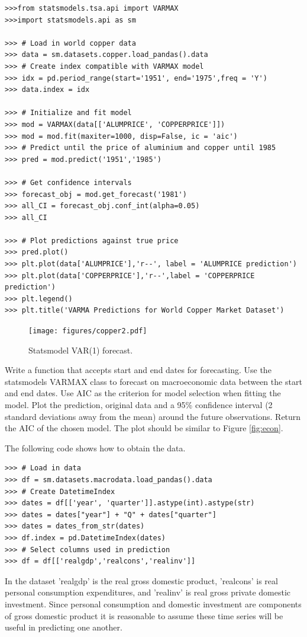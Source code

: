 \begin{lstlisting}
>>>from statsmodels.tsa.api import VARMAX
>>>import statsmodels.api as sm

>>> # Load in world copper data
>>> data = sm.datasets.copper.load_pandas().data
>>> # Create index compatible with VARMAX model
>>> idx = pd.period_range(start='1951', end='1975',freq = 'Y')
>>> data.index = idx

>>> # Initialize and fit model
>>> mod = VARMAX(data[['ALUMPRICE', 'COPPERPRICE']])
>>> mod = mod.fit(maxiter=1000, disp=False, ic = 'aic')
>>> # Predict until the price of aluminium and copper until 1985
>>> pred = mod.predict('1951','1985')

>>> # Get confidence intervals
>>> forecast_obj = mod.get_forecast('1981')
>>> all_CI = forecast_obj.conf_int(alpha=0.05)
>>> all_CI

>>> # Plot predictions against true price
>>> pred.plot()
>>> plt.plot(data['ALUMPRICE'],'r--', label = 'ALUMPRICE prediction')
>>> plt.plot(data['COPPERPRICE'],'r--',label = 'COPPERPRICE prediction')
>>> plt.legend()
>>> plt.title('VARMA Predictions for World Copper Market Dataset')
\end{lstlisting}

\begin{figure}[H]
\centering
\texttt{[image: figures/copper2.pdf]}
\caption{Statsmodel VAR(1) forecast.}
\label{fig:varma}
\end{figure}

\begin{problem}
\label{prob:arma:smvarma}

Write a function  that accepts start and end dates for forecasting.
Use the statsmodels VARMAX class to forecast on macroeconomic data between the start and end dates.
Use AIC as the criterion for model selection when fitting the model.
Plot the prediction, original data and  a 95\% confidence interval (2 standard deviations away from the mean) around the future observations.
Return the AIC of the chosen model.
The plot should be similar to Figure \ref{fig:econ}.

The following code shows how to obtain the data.

\begin{lstlisting}
>>> # Load in data
>>> df = sm.datasets.macrodata.load_pandas().data
>>> # Create DatetimeIndex
>>> dates = df[['year', 'quarter']].astype(int).astype(str)
>>> dates = dates["year"] + "Q" + dates["quarter"]
>>> dates = dates_from_str(dates)
>>> df.index = pd.DatetimeIndex(dates)
>>> # Select columns used in prediction
>>> df = df[['realgdp','realcons','realinv']]
\end{lstlisting}

In the dataset 'realgdp' is the real gross domestic product, 'realcons' is real personal consumption expenditures, and 'realinv' is real gross private domestic investment.
Since personal consumption and domestic investment are components of gross domestic product it is reasonable to assume these time series will be useful in predicting one another.

\end{problem}

